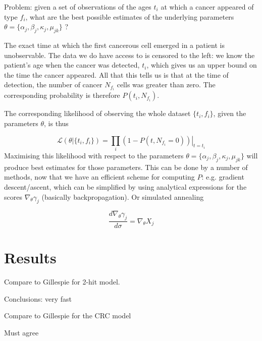 \documentclass{article}
\begin{document}
Problem: given a set of observations of the ages $t_i$ at which a cancer
appeared of type $f_i$, what are the best possible estimates of the underlying
parameters $\theta = \{\alpha_j, \beta_j, \kappa_j, \mu_{jk}\}$ ?

The exact time at which the first cancerous cell emerged in a patient is
unobservable. The data we do have access to is censored to the left:
we know the patient's age when the cancer was detected, $t_i$, which gives us an
upper bound on the time the cancer appeared. All that this tells us is that at
the time of detection, the number of cancer $N_{f_i}$ cells was greater than
zero. The corresponding probability is therefore $P(t_i, N_{f_i})$.

The corresponding likelihood of observing the whole dataset $\{t_i,f_i\}$, given
the parameters $\theta$, is thus


\begin{equation}
    \mathcal{L}(\theta | \{t_i, f_i\}) = \prod_i 
    \left. (1 - P(t, N_{f_i} = 0)) \right|_{t=t_i}
\end{equation}
Maximising this likelihood with respect to the parameters
$\theta = \{\alpha_j, \beta_j, \kappa_j, \mu_{jk}\}$ will produce best estimates
for those parameters.
This can be done by a number of methods, now that we have an efficient scheme
for computing $P$: e.g. gradient descent/ascent, which can be simplified by
using analytical expressions for the scores $\nabla_\theta \gamma_j$ (basically
backpropagation). Or simulated annealing

\begin{equation}
    \frac{d \nabla_\theta \gamma_j}{d \sigma} = \nabla_\theta X_j
\end{equation}

\section{Results}

Compare to Gillespie for 2-hit model.

  Conclusions: very fast

Compare to Gillespie for the CRC model

  Must agree
\end{document}
